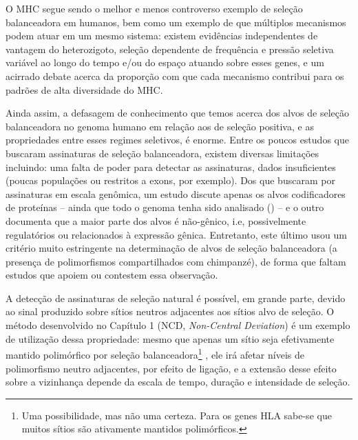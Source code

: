 \begin{refsection}
O MHC segue sendo o melhor e menos controverso exemplo de seleção balanceadora em humanos, bem como um exemplo de que múltiplos mecanismos podem atuar em um mesmo sistema: existem evidências independentes de vantagem do heterozigoto, seleção dependente de frequência e pressão seletiva variável ao longo do tempo e/ou do espaço atuando sobre esses genes, e um acirrado debate acerca da proporção com que cada mecanismo contribui para os padrões de alta diversidade do MHC.

%

Ainda assim, a defasagem de conhecimento que temos acerca dos alvos de seleção balanceadora no genoma humano em relação aos de seleção positiva, e as propriedades entre esses regimes seletivos, é enorme. 
Entre os poucos estudos que buscaram  assinaturas de seleção balanceadora, existem diversas limitações incluindo: uma falta  de poder para detectar as assinaturas,  dados insuficientes (poucas populações ou restritos a  exons, por exemplo). Dos que buscaram por assinaturas em escala genômica, um estudo discute apenas os alvos codificadores de proteínas -- ainda que todo o genoma tenha sido analisado (\cite{DeGiorgio2014}) -- e o outro \parencite{Leffler2013a} documenta que a maior parte dos alvos é não-gênico, i.e, possivelmente regulatórios ou relacionados à expressão gênica. Entretanto, este último usou um critério muito estringente na determinação de alvos de seleção balanceadora (a presença de polimorfismos compartilhados com chimpanzé), de forma que faltam estudos que apoiem ou contestem essa observação.
%


A detecção de assinaturas de seleção natural é possível, em grande parte, devido ao sinal produzido sobre sítios neutros adjacentes aos sítios alvo de seleção. O método desenvolvido no Capítulo 1 (NCD, \emph{Non-Central Deviation}) é um exemplo de utilização dessa propriedade: mesmo que apenas um sítio seja efetivamente mantido polimórfico por seleção balanceadora\footnote{Uma possibilidade, mas não uma certeza. Para os genes HLA sabe-se que muitos sítios são ativamente mantidos polimórficos.} , ele irá afetar níveis de polimorfismo neutro adjacentes, por efeito de ligação, e a extensão desse efeito sobre a vizinhança depende da escala de tempo, duração e intensidade de seleção.


\end{refsection}
